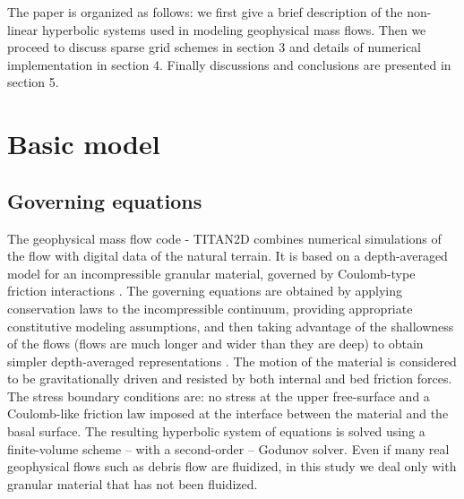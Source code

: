 \documentclass{article}
\begin{document}
The paper is organized as follows: we first give a brief description of the non-linear hyperbolic systems
used in modeling geophysical mass flows. Then we proceed to discuss sparse grid schemes 
in section 3 and details of numerical implementation in section 4. Finally discussions and conclusions
are presented in section 5.

\section{Basic model}
\subsection{Governing equations}
The geophysical mass flow code - TITAN2D combines numerical simulations of the flow with
digital data of the natural terrain. It is based on a depth-averaged
model for an incompressible granular material, governed by
Coulomb-type friction interactions \citep{Savage1989}.  The
governing equations are obtained by applying conservation laws to the
incompressible continuum, providing appropriate constitutive modeling
assumptions, and then taking advantage of the shallowness of the flows
(flows are much longer and wider than they are deep) to obtain simpler
depth-averaged representations  \citep{Patra2005}. The motion of the
material is considered to be gravitationally driven and resisted by
both internal and bed friction forces. The stress boundary conditions
are: no stress at the upper free-surface and a Coulomb-like friction law
imposed at the interface between the material and the basal
surface. The resulting hyperbolic system of equations is solved using a
finite-volume scheme -- with a second-order -- Godunov solver. Even if many
real geophysical flows such as debris flow are fluidized, in this
study we deal only with granular material that has not been fluidized.
\end{document}

